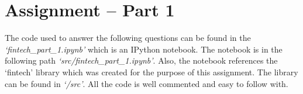 \chapter{Assignment – Part 1}\label{chp:pt2}
The code used to answer the following questions can be found in the \textit{‘fintech\_part\_1.ipynb’} which is an IPython notebook.  The notebook is in the following path \textit{‘src/fintech\_part\_1.ipynb’}. Also, the notebook references the ‘fintech’ library which was created for the purpose of this assignment. The library can be found in \textit{‘/src’}. All the code is well commented and easy to follow with. 





